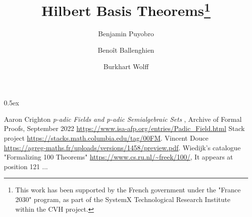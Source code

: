 \documentclass[11pt,a4paper]{article}
\begin{document}
\title{Hilbert Basis Theorems\thanks{This work has been supported by the French government under the "France 2030" program, as part of the SystemX Technological Research Institute within the CVH project.}}
\author{Benjamin Puyobro \and Benoît Ballenghien \and Burkhart Wolff}

\maketitle
\tableofcontents
\newpage
\parindent 0pt\parskip 0.5ex

\begin{thebibliography}{99} %
Aaron Crighton
\textit {p-adic Fields and p-adic Semialgebraic Sets }, Archive of Formal Proofs, September 2022
\url{https://www.isa-afp.org/entries/Padic_Field.html}
Stack project
\url{https://stacks.math.columbia.edu/tag/00FM}.
Vincent Douce
\url{https://agreg-maths.fr/uploads/versions/1458/preview.pdf}.
Wiedijk's catalogue "Formalizing 100 Theorems"
\url{https://www.cs.ru.nl/~freek/100/}, It appears at position 121 ...
\end{thebibliography}
%
%
\end{document}
